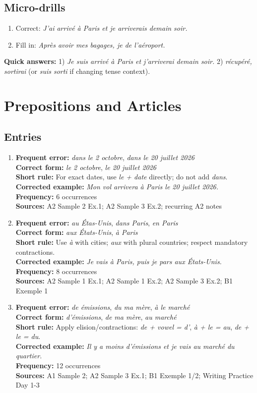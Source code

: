 \documentclass{article}
\newcommand{\mistakeentry}[6]{
\item \textbf{Frequent error:} #1\\
\textbf{Correct form:} #2\\
\textbf{Short rule:} #3\\
\textbf{Corrected example:} #4\\
\textbf{Frequency:} #5\\
\textbf{Sources:} #6
}
\begin{document}
\subsection*{Micro-drills}
\begin{enumerate}
    \item Correct: \textit{J'ai arrivé à Paris et je arriverais demain soir.}
    \item Fill in: \textit{Après avoir \underline{\hspace{2cm}} mes bagages, je \underline{\hspace{2cm}} de l'aéroport.}
\end{enumerate}
\textbf{Quick answers:} 1) \textit{Je suis arrivé à Paris et j'arriverai demain soir.} 2) \textit{récupéré, sortirai} (or \textit{suis sorti} if changing tense context).

\section{Prepositions and Articles}
\subsection*{Entries}
\begin{enumerate}
    \mistakeentry
    {\textit{dans le 2 octobre}, \textit{dans le 20 juillet 2026}}
    {\textit{le 2 octobre}, \textit{le 20 juillet 2026}}
    {For exact dates, use \textit{le + date} directly; do not add \textit{dans}.}
    {\textit{Mon vol arrivera à Paris le 20 juillet 2026.}}
    {6 occurrences}
    {A2 Sample 2 Ex.1; A2 Sample 3 Ex.2; recurring A2 notes}

    \mistakeentry
    {\textit{au Étas-Unis}, \textit{dans Paris}, \textit{en Paris}}
    {\textit{aux États-Unis}, \textit{à Paris}}
    {Use \textit{à} with cities; \textit{aux} with plural countries; respect mandatory contractions.}
    {\textit{Je vais à Paris, puis je pars aux États-Unis.}}
    {8 occurrences}
    {A2 Sample 1 Ex.1; A2 Sample 1 Ex.2; A2 Sample 3 Ex.2; B1 Exemple 1}

    \mistakeentry
    {\textit{de émissions}, \textit{du ma mère}, \textit{à le marché}}
    {\textit{d'émissions}, \textit{de ma mère}, \textit{au marché}}
    {Apply elision/contractions: \textit{de + vowel = d'}, \textit{à + le = au}, \textit{de + le = du}.}
    {\textit{Il y a moins d'émissions et je vais au marché du quartier.}}
    {12 occurrences}
    {A1 Sample 2; A2 Sample 3 Ex.1; B1 Exemple 1/2; Writing Practice Day 1-3}
\end{enumerate}
\end{document}
